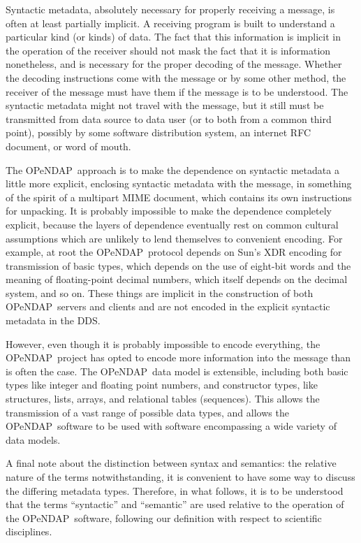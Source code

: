 \documentclass{codata}
\newcommand{\opendap}{\ac{OPeNDAP}}
\newcommand{\dds}{\ac{DDS}}
\begin{document}
Syntactic metadata, absolutely necessary for properly receiving a
message, is often at least partially implicit.  A receiving program is
built to understand a particular kind (or kinds) of data.  
The fact that this information is implicit in the operation of the
receiver should not mask the fact that it is information nonetheless,
and is necessary for the proper decoding of the message.  Whether the
decoding instructions come with the message or by some other method,
the receiver of the message must have them if the message is to be
understood.  The syntactic metadata might not travel with the message,
but it still must be transmitted from data source to data user (or to
both from a common third point), possibly by some software
distribution system, an internet RFC document, or word of mouth.

The \opendap\ approach is to make the dependence on syntactic metadata
a little more explicit, enclosing syntactic metadata with the message,
in something of the spirit of a multipart MIME document, which
contains its own instructions for unpacking.  It is probably
impossible to make the dependence completely explicit, because the
layers of dependence eventually rest on common cultural assumptions
which are unlikely to lend themselves to convenient encoding.  For
example, at root the \opendap\ protocol depends on Sun's XDR encoding
for transmission of basic types, which depends on the use of
eight-bit words and the meaning of floating-point decimal numbers,
which itself depends on the decimal system, and so on.  These
things are implicit in the construction of both \opendap\ servers and
clients and are not encoded in the explicit syntactic metadata in the
\dds.

However, even though it is probably impossible to encode everything,
the \opendap\ project has opted to encode more information into the
message than is often the case.  The \opendap\ data model is
extensible, including both basic types like integer and floating point
numbers, and constructor types, like structures, lists, arrays, and
relational tables (sequences).  This allows the transmission of a vast
range of possible data types, and allows the \opendap\ software to be
used with software encompassing a wide variety of data models.


A final note about the distinction between syntax and semantics: the
relative nature of the terms notwithstanding, it is convenient to have
some way to discuss the differing metadata types.  Therefore, in what
follows, it is to be understood that the terms ``syntactic'' and
``semantic'' are used relative to the operation of the \opendap\ 
software, following our definition with respect to scientific
disciplines.
\end{document}
